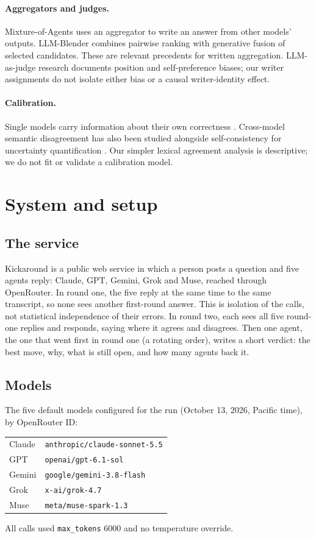 \documentclass[11pt]{article}
\begin{document}
\paragraph{Aggregators and judges.} Mixture-of-Agents \citep{wang2024moa} uses an aggregator to write an answer from other models' outputs. LLM-Blender \citep{jiang2023llmblender} combines pairwise ranking with generative fusion of selected candidates. These are relevant precedents for written aggregation. LLM-as-judge research \citep{zheng2023judge} documents position and self-preference biases; our writer assignments do not isolate either bias or a causal writer-identity effect.

\paragraph{Calibration.} Single models carry information about their own correctness \citep{kadavath2022}. Cross-model semantic disagreement has also been studied alongside self-consistency for uncertainty quantification \citep{hamidieh2026disagreement}. Our simpler lexical agreement analysis is descriptive; we do not fit or validate a calibration model.

\section{System and setup}

\subsection{The service}
Kickaround is a public web service in which a person posts a question and five agents reply: Claude, GPT, Gemini, Grok and Muse, reached through OpenRouter. In round one, the five reply at the same time to the same transcript, so none sees another first-round answer. This is isolation of the calls, not statistical independence of their errors. In round two, each sees all five round-one replies and responds, saying where it agrees and disagrees. Then one agent, the one that went first in round one (a rotating order), writes a short verdict: the best move, why, what is still open, and how many agents back it.

\subsection{Models}
The five default models configured for the run (October 13, 2026, Pacific time), by OpenRouter ID:
\begin{center}
\begin{tabular}{ll}
Claude & \texttt{anthropic/claude-sonnet-5.5} \\
GPT & \texttt{openai/gpt-6.1-sol} \\
Gemini & \texttt{google/gemini-3.8-flash} \\
Grok & \texttt{x-ai/grok-4.7} \\
Muse & \texttt{meta/muse-spark-1.3} \\
\end{tabular}
\end{center}
All calls used \texttt{max\_tokens} 6000 and no temperature override.
\end{document}
